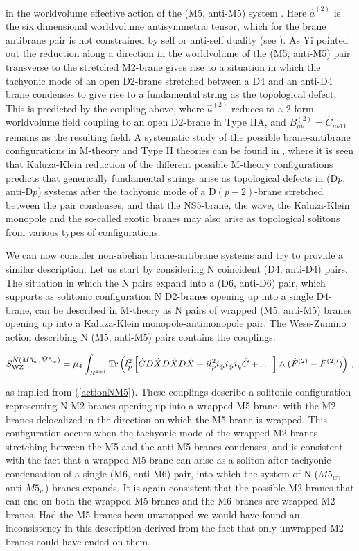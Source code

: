 \documentclass[12pt,a4paper]{article}
\begin{document}
\noindent in the worldvolume effective action of the (M5, anti-M5)
system \cite{Yi}. Here ${\hat a}^{(2)}$ is the
six dimensional worldvolume antisymmetric tensor, which for the
brane antibrane pair is not constrained by self or anti-self
duality (see \cite{Yi}).
As Yi pointed out the reduction along a
direction in the worldvolume of the (M5, anti-M5) pair transverse 
to the
stretched M2-brane gives rise to a situation in which the tachyonic
mode of an open D2-brane stretched between a D4 and an anti-D4 brane 
condenses to give rise to a fundamental string as the topological
defect. This is predicted by the coupling above, where 
${\hat a}^{(2)}$ reduces to a 2-form worldvolume field coupling 
to an open D2-brane in Type IIA, and 
$B^{(2)}_{\mu\nu}={\hat C}_{\mu\nu 11}$ remains as the
resulting field.
A systematic
study of the possible brane-antibrane configurations in M-theory
and Type II theories can be found in \cite{HL1}, where it is seen 
that Kaluza-Klein reduction of the different possible M-theory 
configurations predicts that generically
fundamental strings arise as topological defects in (D$p$, anti-D$p$)
systems after the tachyonic mode of a D$(p-2)$-brane stretched
between the pair condenses, and that
the NS5-brane, the wave, the Kaluza-Klein
monopole and the so-called exotic branes may also arise 
as topological solitons from various types of configurations.

We can now consider non-abelian brane-antibrane systems and
try to provide a similar description.
Let us start by considering N coincident 
(D4, anti-D4) pairs. The situation in which the 
N pairs expand into a (D6, anti-D6) pair,
which supports as solitonic configuration N D2-branes opening up into
a single D4-brane, can be described in M-theory as N pairs of
wrapped (M5, anti-M5) branes opening up into a Kaluza-Klein
monopole-antimonopole pair. 
The Wess-Zumino action describing N (M5, anti-M5) pairs
contains the couplings:

\begin{equation}
\label{M5antiM5}
S^{N({M5}_w, {\bar M5}_w)}_{\rm WZ}=\mu_4\int_{R^{4+1}}{\rm Tr}
\left(l_p^2\left[{\hat C}
D{\hat X}D{\hat X}D{\hat X}+il_p^2 i_{\hat \Phi} i_{\hat \Phi} 
i_{\hat k} {\hat {\tilde C}}+
\dots\right]\wedge ({\hat F}^{(2)}-{\hat F}^{(2)\prime})\right)\, ,
\end{equation}

\noindent as implied from (\ref{actionNM5}).
These couplings describe a solitonic
configuration representing N M2-branes opening up into a wrapped
M5-brane, with the M2-branes delocalized in the direction on which
the M5-brane is wrapped.
This configuration occurs when the tachyonic mode of the
wrapped M2-branes stretching between the M5 and the anti-M5 branes
condenses, and is consistent with the fact that a wrapped M5-brane
can arise as a soliton after tachyonic condensation of a single
(M6, anti-M6) pair, into which the system of N 
($M5_w$, anti-$M5_w$) branes
expands. It is again consistent that the possible M2-branes that
can end on both the wrapped M5-branes and the M6-branes are wrapped
M2-branes. Had the M5-branes been unwrapped we would have found an
inconsistency in this description derived from the fact that only
unwrapped M2-branes could have ended on them.
 
\end{document}
